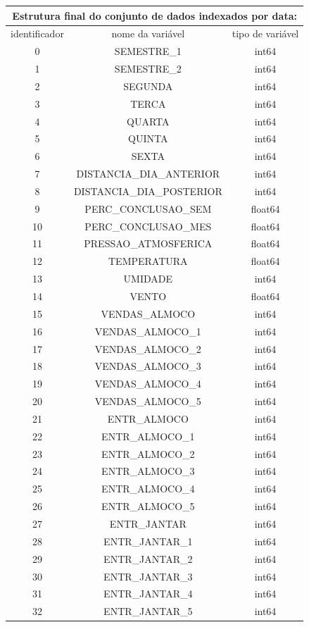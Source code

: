 \documentclass[	12pt, Times, openright, twoside, a4paper, english, brazil]{abntex2}
\begin{document}
       
         { \centering
        \begin{tabular}{|c|c|c|} \hline
        \multicolumn{3}{c}{ Estrutura final do conjunto de dados indexados por data: } \\
        \hline
        identificador &	nome da variável					&tipo de variável\\ 
        \hline
        0&	SEMESTRE\_1					&int64 \\
        1&	SEMESTRE\_2					&int64\\
        2&	SEGUNDA						&int64 \\
        3&	TERCA						&int64 \\
        4&	QUARTA						&int64 \\ 
        5&	QUINTA						&int64 \\ 
        6&	SEXTA						&int64 \\ 
        7&	DISTANCIA\_DIA\_ANTERIOR	&	int64 \\ 
        8&	DISTANCIA\_DIA\_POSTERIOR	&	int64 \\
        9&	PERC\_CONCLUSAO\_SEM		&	float64 \\
        10&	PERC\_CONCLUSAO\_MES		&	float64 \\
        11&	PRESSAO\_ATMOSFERICA		&	float64 \\
        12&	TEMPERATURA					&float64 \\ 
        13&	UMIDADE						&int64 \\
        14&	VENTO						&float64\\ 
        15&	VENDAS\_ALMOCO				&int64 \\
        16&	VENDAS\_ALMOCO\_1			&	int64 \\ 
        17&	VENDAS\_ALMOCO\_2			&	int64 \\
        18&	VENDAS\_ALMOCO\_3			&	int64\\ 
        19&	VENDAS\_ALMOCO\_4			&	int64 \\
        20&	VENDAS\_ALMOCO\_5			&	int64 \\ 
        21&	ENTR\_ALMOCO				&	int64\\
        22&	ENTR\_ALMOCO\_1				&int64 \\
        23&	ENTR\_ALMOCO\_2				&int64 \\
        24&	ENTR\_ALMOCO\_3				&int64 \\ 
        25&	ENTR\_ALMOCO\_4				&int64 \\
        26&	ENTR\_ALMOCO\_5				&int64 \\
        27&	ENTR\_JANTAR				&	int64 \\ 
        28&	ENTR\_JANTAR\_1				&int64\\
        29&	ENTR\_JANTAR\_2				&int64 \\ 
        30&	ENTR\_JANTAR\_3				&int64 \\ 
        31&	ENTR\_JANTAR\_4				&int64 \\
        32&	ENTR\_JANTAR\_5				&int64\\
              \hline
    \end{tabular} }
    
\end{document}
